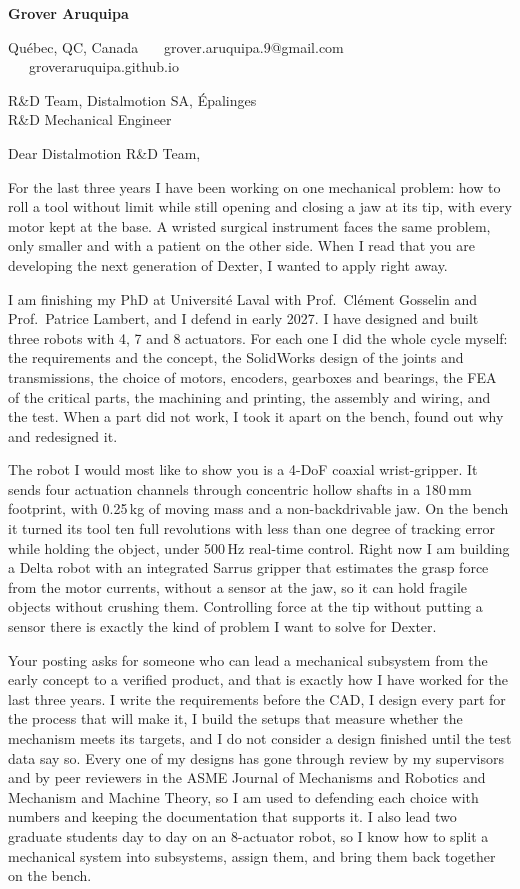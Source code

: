 \documentclass[11pt,a4paper]{article}
\begin{document}
{\large\bfseries Grover Aruquipa}\par\vspace{-6pt}
{\small Qu\'ebec, QC, Canada \ \textbullet\ \ grover.aruquipa.9@gmail.com \ \textbullet\ \ groveraruquipa.github.io}

\vspace{4pt}
R\&D Team, Distalmotion SA, \'Epalinges\\
R\&D Mechanical Engineer

Dear Distalmotion R\&D Team,

For the last three years I have been working on one mechanical problem: how to roll a tool without limit while still opening and closing a jaw at its tip, with every motor kept at the base. A wristed surgical instrument faces the same problem, only smaller and with a patient on the other side. When I read that you are developing the next generation of Dexter, I wanted to apply right away.

I am finishing my PhD at Universit\'e Laval with Prof.\ Cl\'ement Gosselin and Prof.\ Patrice Lambert, and I defend in early 2027. I have designed and built three robots with 4, 7 and 8 actuators. For each one I did the whole cycle myself: the requirements and the concept, the SolidWorks design of the joints and transmissions, the choice of motors, encoders, gearboxes and bearings, the FEA of the critical parts, the machining and printing, the assembly and wiring, and the test. When a part did not work, I took it apart on the bench, found out why and redesigned it.

The robot I would most like to show you is a 4-DoF coaxial wrist-gripper. It sends four actuation channels through concentric hollow shafts in a 180\,mm footprint, with 0.25\,kg of moving mass and a non-backdrivable jaw. On the bench it turned its tool ten full revolutions with less than one degree of tracking error while holding the object, under 500\,Hz real-time control. Right now I am building a Delta robot with an integrated Sarrus gripper that estimates the grasp force from the motor currents, without a sensor at the jaw, so it can hold fragile objects without crushing them. Controlling force at the tip without putting a sensor there is exactly the kind of problem I want to solve for Dexter.

Your posting asks for someone who can lead a mechanical subsystem from the early concept to a verified product, and that is exactly how I have worked for the last three years. I write the requirements before the CAD, I design every part for the process that will make it, I build the setups that measure whether the mechanism meets its targets, and I do not consider a design finished until the test data say so. Every one of my designs has gone through review by my supervisors and by peer reviewers in the ASME Journal of Mechanisms and Robotics and Mechanism and Machine Theory, so I am used to defending each choice with numbers and keeping the documentation that supports it. I also lead two graduate students day to day on an 8-actuator robot, so I know how to split a mechanical system into subsystems, assign them, and bring them back together on the bench.
\end{document}
